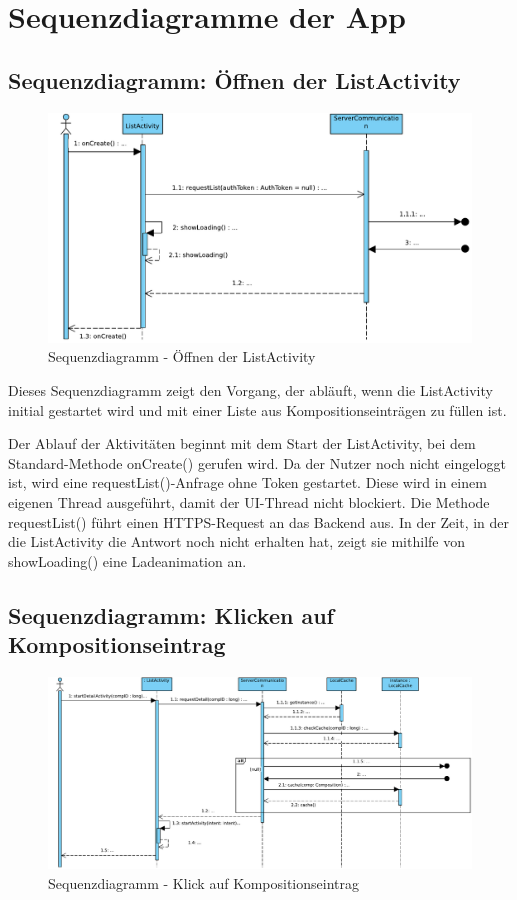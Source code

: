\section*{Sequenzdiagramme der App}
\subsection*{Sequenzdiagramm: Öffnen der ListActivity}

\begin{figure}[h]
	\centering
	\includegraphics[width=\textwidth]{img/Diagramme/Sequenz/App_list}
	\caption{Sequenzdiagramm - Öffnen der ListActivity}
	\label{fig:sequenz-app_list}
\end{figure}
\noindent
Dieses Sequenzdiagramm zeigt den Vorgang, der abläuft, wenn die ListActivity initial gestartet wird und mit einer Liste aus Kompositionseinträgen zu füllen ist.\newline

\noindent Der Ablauf der Aktivitäten beginnt mit dem Start der ListActivity, bei dem Standard-Methode onCreate() gerufen wird. Da der Nutzer noch nicht eingeloggt ist, wird eine requestList()-Anfrage ohne Token gestartet. Diese wird in einem eigenen Thread ausgeführt, damit der UI-Thread nicht blockiert. Die Methode requestList() führt einen HTTPS-Request an das Backend aus. In der Zeit, in der die ListActivity die Antwort noch nicht erhalten hat, zeigt sie mithilfe von showLoading() eine Ladeanimation an.
\pagebreak
\subsection*{Sequenzdiagramm: Klicken auf Kompositionseintrag}

\begin{figure}[h]
	\centering
	\includegraphics[width=\textwidth]{img/Diagramme/Sequenz/App_detail}
	\caption{Sequenzdiagramm - Klick auf Kompositionseintrag}
	\label{fig:sequenz-App_detail}
\end{figure}


